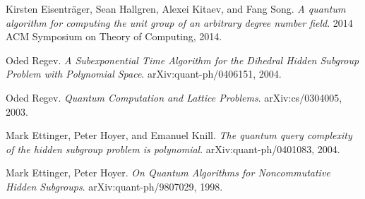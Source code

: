 \documentclass[12pt]{article}
\theoremstyle{plain}
\theoremstyle{definition}
\begin{document}
\newpage
%
\begin{thebibliography}{9}

 Kirsten Eisentr{\"a}ger, Sean Hallgren, Alexei Kitaev, and Fang Song.
 \emph{A quantum algorithm for computing the unit group of an arbitrary degree number field}. 2014 ACM Symposium on Theory of Computing, 2014.

 Oded Regev.
 \emph{A Subexponential Time Algorithm for the Dihedral Hidden Subgroup Problem with Polynomial Space}. arXiv:quant-ph/0406151, 2004.
 
 Oded Regev.
 \emph{Quantum Computation and Lattice Problems}. arXiv:cs/0304005, 2003.
 
 Mark Ettinger, Peter Hoyer, and Emanuel Knill.
 \emph{The quantum query complexity of the hidden subgroup problem is polynomial}. arXiv:quant-ph/0401083, 2004.
 
 Mark Ettinger, Peter Hoyer.
 \emph{On Quantum Algorithms for Noncommutative Hidden Subgroups}. arXiv:quant-ph/9807029, 1998.
 

\end{thebibliography}
%
\end{document}
